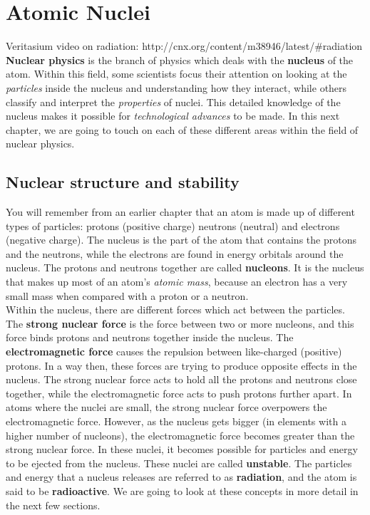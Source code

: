 \chapter{Atomic Nuclei}
\label{chap:an}
Veritasium video on radiation: http://cnx.org/content/m38946/latest/#radiation
\textbf{Nuclear physics} is the branch of physics which deals with the \textbf{nucleus} of the atom. Within this field, some scientists focus their attention on looking at the \textit{particles} inside the nucleus and understanding how they interact, while others classify and interpret the \textit{properties} of nuclei. This detailed knowledge of the nucleus makes it possible for \textit{technological advances} to be made. In this next chapter, we are going to touch on each of these different areas within the field of nuclear physics.



\section{Nuclear structure and stability}
\label{sec:an:ns}

You will remember from an earlier chapter that an atom is made up of different types of particles: protons (positive charge) neutrons (neutral) and electrons (negative charge). The nucleus is the part of the atom that contains the protons and the neutrons, while the electrons are found in energy orbitals around the nucleus. The protons and neutrons together are called \textbf{nucleons}. It is the nucleus that makes up most of an atom's \textit{atomic mass}, because an electron has a very small mass when compared with a proton or a neutron.\\

Within the nucleus, there are different forces which act between the particles. The \textbf{strong nuclear force} is the force between two or more nucleons, and this force binds protons and neutrons together inside the nucleus. The \textbf{electromagnetic force} causes the repulsion between like-charged (positive) protons. In a way then, these forces are trying to produce opposite effects in the nucleus. The strong nuclear force acts to hold all the protons and neutrons close together, while the electromagnetic force acts to push protons further apart. In atoms where the nuclei are small, the strong nuclear force overpowers the electromagnetic force. However, as the nucleus gets bigger (in elements with a higher number of nucleons), the electromagnetic force becomes greater than the strong nuclear force. In these nuclei, it becomes possible for particles and energy to be ejected from the nucleus. These nuclei are called \textbf{unstable}. The particles and energy that a nucleus releases are referred to as \textbf{radiation}, and the atom is said to be \textbf{radioactive}. We are going to look at these concepts in more detail in the next few sections.



